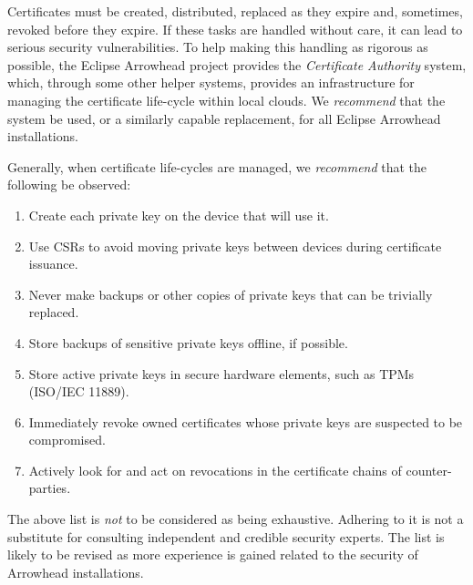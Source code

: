 %
%

Certificates must be created, distributed, replaced as they expire and, sometimes, revoked before they expire.
If these tasks are handled without care, it can lead to serious security vulnerabilities.
To help making this handling as rigorous as possible, the Eclipse Arrowhead project provides the \textit{Certificate Authority} system, which, through some other helper systems, provides an infrastructure for managing the certificate life-cycle within local clouds.
We \textit{recommend} that the system be used, or a similarly capable replacement, for all Eclipse Arrowhead installations.

Generally, when certificate life-cycles are managed, we \textit{recommend} that the following be observed:

\begin{enumerate}
\item Create each private key on the device that will use it.
\item Use CSRs to avoid moving private keys between devices during certificate issuance.
\item Never make backups or other copies of private keys that can be trivially replaced.
\item Store backups of sensitive private keys offline, if possible.
\item Store active private keys in secure hardware elements, such as TPMs (ISO/IEC 11889).
\item Immediately revoke owned certificates whose private keys are suspected to be compromised.
\item Actively look for and act on revocations in the certificate chains of counter-parties.
\end{enumerate}

The above list is \textit{not} to be considered as being exhaustive.
Adhering to it is not a substitute for consulting independent and credible security experts.
The list is likely to be revised as more experience is gained related to the security of Arrowhead installations.
